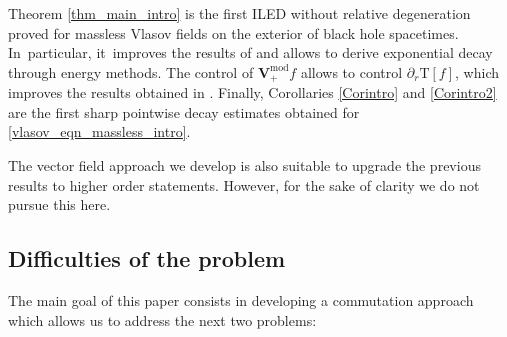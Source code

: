 \documentclass[JEP,XML,SOM,Unicode,published]{cedram}
\theoremstyle{plain}
\theoremstyle{definition}
\begin{document}
Theorem \ref{thm_main_intro} is the first ILED without relative degeneration proved for massless Vlasov fields on the exterior of black hole spacetimes. In~particular, it~improves the results of \cite{ABJ, L23} and allows to derive exponential decay through energy methods. The control of $\pmb{V}_+^{\mathrm{mod}} f$ allows to control $\partial_r \mathrm{T}[f]$, which improves the results obtained in \cite{ABJ, L23, W23}. Finally, Corollaries \ref{Corintro} and \ref{Corintro2} are the first sharp pointwise decay estimates obtained for \eqref{vlasov_eqn_massless_intro}.

The vector field approach we develop is also suitable to upgrade the previous results to higher order statements. However, for the sake of clarity we do not pursue this here.

\subsection{Difficulties of the problem}
The main goal of this paper consists in developing a commutation approach which allows us to address the next two problems:
\end{document}
